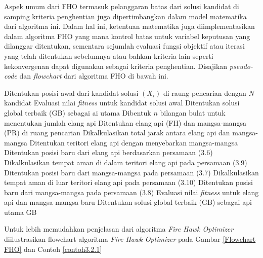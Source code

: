 Aspek umum dari FHO termasuk pelanggaran batas dari solusi kandidat di samping kriteria penghentian juga dipertimbangkan dalam model matematika dari algoritma ini. Dalam hal ini, ketentuan matematika juga diimplementasikan dalam algoritma FHO yang mana kontrol batas untuk variabel keputusan yang dilanggar ditentukan, sementara sejumlah evaluasi fungsi objektif atau iterasi yang telah ditentukan sebelumnya atau bahkan kriteria lain seperti kekonvergenan dapat digunakan sebagai kriteria penghentian. Disajikan \textit{pseudo-code} dan \textit{flowchart} dari algoritma FHO di bawah ini.

\begin{algorithm}
\begin{varwidth}{\linewidth}
\caption{Fire Hawk Optimizer (FHO)}
\begin{algorithmic}[1]
    \State Ditentukan posisi awal dari kandidat solusi $(X_i)$ di raung pencarian dengan $N$ kandidat
    \State Evaluasi nilai \textit{fitness} untuk kandidat solusi awal
    \State Ditentukan solusi global terbaik (GB) sebagai ai utama
        \State Dibentuk $n$ bilangan bulat untuk menentukan jumlah elang api
        \State Ditentukan elang api (FH) dan mangsa-mangsa (PR) di ruang pencarian
        \State Dikalkulasikan total jarak antara elang api dan mangsa-mangsa
        \State Ditentukan teritori elang api dengan menyebarkan mangsa-mangsa
            \State Ditentukan posisi baru dari elang api berdasarkan persamaan (3.6)
                \State Dikalkulasikan tempat aman di dalam teritori elang api pada persamaan (3.9)
                \State Ditentukan posisi baru dari mangsa-mangsa pada persamaan (3.7)
                \State Dikalkulasikan tempat aman di luar teritori elang api pada persamaan (3.10)
                \State Ditentukan posisi baru dari mangsa-mangsa pada persamaan (3.8)
            \EndFor
        \EndFor
        \State Evaluasi nilai \textit{fitness} untuk elang api dan mangsa-mangsa baru
        \State Ditentukan solusi global terbaik (GB) sebagai api utama
    \EndWhile
    \State \Return GB
\EndProcedure
\end{algorithmic}
\end{varwidth}
\end{algorithm}

Untuk lebih memudahkan penjelasan dari algoritma \textit{Fire Hawk Optimizer} diilustrasikan flowchart algoritma \textit{Fire Hawk Optimizer} pada Gambar \ref{Flowchart FHO} dan Contoh \ref{contoh3.2.1}

